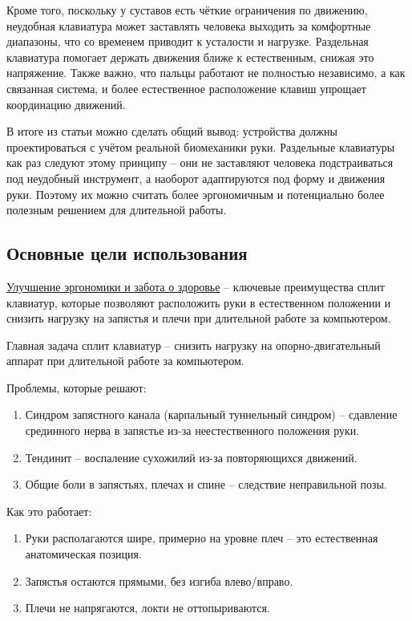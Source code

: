 Кроме того, поскольку у суставов есть чёткие ограничения по движению, неудобная клавиатура может заставлять человека выходить за комфортные диапазоны, что со временем приводит к усталости и нагрузке. Раздельная клавиатура помогает держать движения ближе к естественным, снижая это напряжение. Также важно, что пальцы работают не полностью независимо, а как связанная система, и более естественное расположение клавиш упрощает координацию движений.

В итоге из статьи можно сделать общий вывод: устройства должны проектироваться с учётом реальной биомеханики руки. Раздельные клавиатуры как раз следуют этому принципу -- они не заставляют человека подстраиваться под неудобный инструмент, а наоборот адаптируются под форму и движения руки. Поэтому их можно считать более эргономичным и потенциально более полезным решением для длительной работы.

\subsection{Основные цели использования}

\underline{Улучшение эргономики и забота о здоровье} -- ключевые преимущества сплит клавиатур, которые позволяют расположить руки в естественном положении и снизить нагрузку на запястья и плечи при длительной работе за компьютером.

Главная задача сплит клавиатур -- снизить нагрузку на опорно-двигательный аппарат при длительной работе за компьютером.

Проблемы, которые решают:

\begin{enumerate}
\item Синдром запястного канала (карпальный туннельный синдром) -- сдавление срединного нерва в запястье из-за неестественного положения руки.
\item Тендинит -- воспаление сухожилий из-за повторяющихся движений.
\item Общие боли в запястьях, плечах и спине -- следствие неправильной позы.
\end{enumerate}

Как это работает:

\begin{enumerate}
\item Руки располагаются шире, примерно на уровне плеч -- это естественная анатомическая позиция.
\item Запястья остаются прямыми, без изгиба влево/вправо.
\item Плечи не напрягаются, локти не оттопыриваются.
\end{enumerate}

